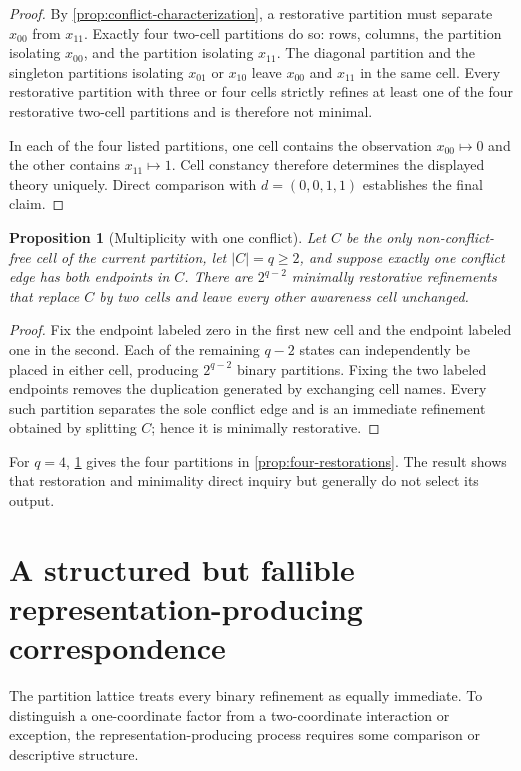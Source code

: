 \documentclass[11pt]{article}
\newtheorem{proposition}[assumption]{Proposition}
\begin{document}
\begin{proof}
By \cref{prop:conflict-characterization}, a restorative partition must separate
$x_{00}$ from $x_{11}$.  Exactly four two-cell partitions do so: rows, columns,
the partition isolating $x_{00}$, and the partition isolating $x_{11}$.  The
diagonal partition and the singleton partitions isolating $x_{01}$ or $x_{10}$
leave $x_{00}$ and $x_{11}$ in the same cell.  Every restorative partition with
three or four cells strictly refines at least one of the four restorative
two-cell partitions and is therefore not minimal.

In each of the four listed partitions, one cell contains the observation
$x_{00}\mapsto0$ and the other contains $x_{11}\mapsto1$.  Cell constancy
therefore determines the displayed theory uniquely.  Direct comparison with
$d=(0,0,1,1)$ establishes the final claim.
\end{proof}

\begin{proposition}[Multiplicity with one conflict]
\label{prop:multiplicity}
Let $C$ be the only non-conflict-free cell of the current partition, let
$|C|=q\geq2$, and suppose exactly one conflict edge has both endpoints in $C$.
There are $2^{q-2}$ minimally restorative refinements that replace $C$ by two
cells and leave every other awareness cell unchanged.
\end{proposition}

\begin{proof}
Fix the endpoint labeled zero in the first new cell and the endpoint labeled one
in the second.  Each of the remaining $q-2$ states can independently be placed
in either cell, producing $2^{q-2}$ binary partitions.  Fixing the two labeled
endpoints removes the duplication generated by exchanging cell names.  Every
such partition separates the sole conflict edge and is an immediate refinement
obtained by splitting $C$; hence it is minimally restorative.
\end{proof}

For $q=4$, \cref{prop:multiplicity} gives the four partitions in
\cref{prop:four-restorations}.  The result shows that restoration and
minimality direct inquiry but generally do not select its output.

\section{A structured but fallible representation-producing correspondence}

The partition lattice treats every binary refinement as equally immediate.  To
distinguish a one-coordinate factor from a two-coordinate interaction or
exception, the representation-producing process requires some comparison or
descriptive structure.
\end{document}
